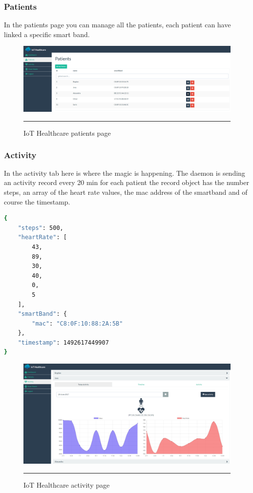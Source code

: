 \subsubsection*{Patients}
In the patients page you can manage all the patients, each patient can have linked a specific smart band.

\begin{figure}[h!]
	\centering
	\includegraphics[width=1\textwidth]{./images/iothpatient}
	\rule{1\textwidth}{1pt}
	\caption{IoT Healthcare patients page}
\end{figure}

\subsubsection{Activity}
In the activity tab here is where the magic is happening. The daemon is sending an activity record every 20 min for each patient the record object has the number steps, an array of the heart rate values, the mac address of the smartband and of course the timestamp. 
\begin{lstlisting}[language=Bash] 
{
	"steps": 500,
	"heartRate": [
		43,
		89,
		30,
		40,
		0,
		5
	],
	"smartBand": {
		"mac": "C8:0F:10:88:2A:5B"
	},
	"timestamp": 1492617449907   
}
\end{lstlisting}      

\begin{figure}[h!]
	\centering
	\includegraphics[width=1\textwidth]{./images/iothactivity}
	\rule{1\textwidth}{1pt}
	\caption{IoT Healthcare activity page}
\end{figure}

